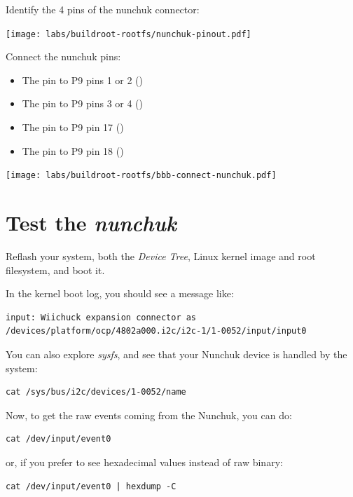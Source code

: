 Identify the 4 pins of the nunchuk connector:

\begin{center}
\texttt{[image: labs/buildroot-rootfs/nunchuk-pinout.pdf]}
\end{center}

Connect the nunchuk pins:
\begin{itemize}
\item The  pin to P9 pins 1 or 2 ()
\item The  pin to P9 pins 3 or 4 ()
\item The  pin to P9 pin 17 ()
\item The  pin to P9 pin 18 ()
\end{itemize}

\begin{center}
\texttt{[image: labs/buildroot-rootfs/bbb-connect-nunchuk.pdf]}
\end{center}

\section{Test the {\em nunchuk}}

Reflash your system, both the {\em Device Tree}, Linux kernel image
and root filesystem, and boot it.

In the kernel boot log, you should see a message like:

\begin{verbatim}
input: Wiichuck expansion connector as /devices/platform/ocp/4802a000.i2c/i2c-1/1-0052/input/input0
\end{verbatim}

You can also explore {\em sysfs}, and see that your Nunchuk device is
handled by the system:

\begin{verbatim}
cat /sys/bus/i2c/devices/1-0052/name
\end{verbatim}

Now, to get the raw events coming from the Nunchuk, you can do:

\begin{verbatim}
cat /dev/input/event0
\end{verbatim}

or, if you prefer to see hexadecimal values instead of raw binary:

\begin{verbatim}
cat /dev/input/event0 | hexdump -C
\end{verbatim}

